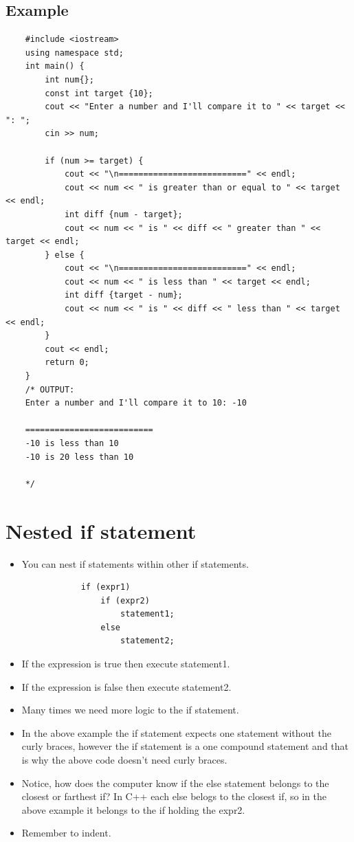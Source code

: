 \subsection{Example}
\begin{verbatim}
    #include <iostream>
    using namespace std;
    int main() {
        int num{};
        const int target {10};
        cout << "Enter a number and I'll compare it to " << target << ": ";
        cin >> num;

        if (num >= target) {
            cout << "\n==========================" << endl;
            cout << num << " is greater than or equal to " << target << endl;
            int diff {num - target};
            cout << num << " is " << diff << " greater than " << target << endl;
        } else {
            cout << "\n==========================" << endl;
            cout << num << " is less than " << target << endl;
            int diff {target - num};
            cout << num << " is " << diff << " less than " << target << endl;
        }
        cout << endl;
        return 0;
    }
    /* OUTPUT:
    Enter a number and I'll compare it to 10: -10

    ==========================
    -10 is less than 10
    -10 is 20 less than 10

    */
\end{verbatim}


\section{Nested if statement}
\begin{itemize}
    \item You can nest if statements within other if statements.
        \begin{verbatim}
            if (expr1) 
                if (expr2) 
                    statement1;
                else 
                    statement2;
        \end{verbatim}
    
    \item If the expression is true then execute statement1.
    \item If the expression is false then execute statement2.
    \item Many times we need more logic to the if statement.
    \item In the above example the if statement expects one statement without the curly braces, however the if statement is a one compound statement and that is why the above code doesn't need curly braces.
    \item Notice, how does the computer know if the else statement belongs to the closest or farthest if? In C++ each else belogs to the closest if, so in the above example it belongs to the if holding the expr2.
    \item Remember to indent.
\end{itemize}

